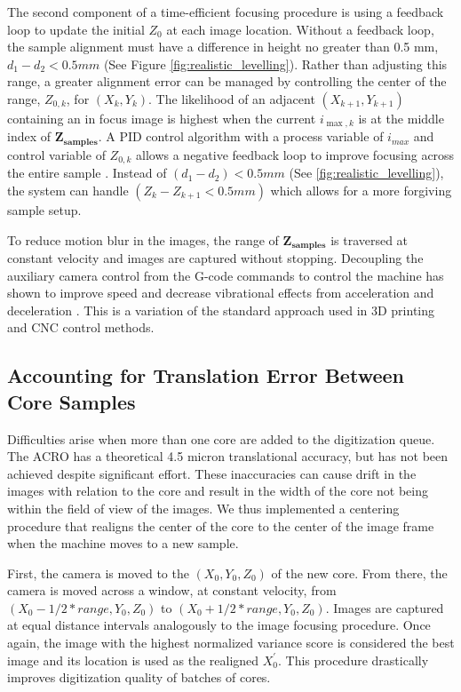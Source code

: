 \documentclass[a4paper,12pt]{article}
\begin{document}
The second component of a time-efficient focusing procedure is using a feedback loop to update the initial $Z_0$ at each image location. 
Without a feedback loop, the sample alignment must have a difference in height no greater than 0.5 mm, $d_1 - d_2 < 0.5 mm $ (See Figure \ref{fig:realistic_levelling}). 
Rather than adjusting this range, a greater alignment error can be managed by controlling the center of the range, $Z_{0,k}$, for $(X_k,Y_k)$. 
The likelihood of an adjacent $(X_{k+1}, Y_{k+1})$ containing an in focus image is highest when the current $i_{{\max,k}}$ is at the middle index of $\boldsymbol{Z_{samples}}$. 
A PID control algorithm with a process variable of $i_{max}$ and control variable of $Z_{0,k}$ allows a negative feedback loop to improve focusing across the entire sample \citep{odwyer_summary_2000}. 
Instead of $(d_1 - d_2) < 0.5mm$ (See \ref{fig:realistic_levelling}), the system can handle $(Z_{k} - Z_{k+1} < 0.5mm)$ which allows for a more forgiving sample setup. %

To reduce motion blur in the images, the range of $\boldsymbol{Z_{\text{samples}}}$ is traversed at constant velocity and images are captured without stopping. 
Decoupling the auxiliary camera control from the G-code commands to control the machine has shown to improve speed and decrease vibrational effects from acceleration and deceleration \citep{propst_time_2025}.
This is a variation of the standard approach used in 3D printing and CNC control methods. %
  
\subsection{Accounting for Translation Error Between Core Samples}

Difficulties arise when more than one core are added to the digitization queue.
The ACRO has a theoretical 4.5 micron translational accuracy, but has not been achieved despite significant effort.
These inaccuracies can cause drift in the images with relation to the core and result in the width of the core not being within the field of view of the images.
We thus implemented a centering procedure that realigns the center of the core to the center of the image frame when the machine moves 
to a new sample. 

First, the camera is moved to the $(X_0, Y_0, Z_0)$ of the new core. 
From there, the camera is moved across a window, at constant velocity, from $(X_0 - 1/2*{range}, Y_0, Z_0)$ to $(X_0 + 1/2*{range}, Y_0, Z_0)$. 
Images are captured at equal distance intervals analogously to the image focusing procedure. 
Once again, the image with the highest normalized variance score is considered the best image and its location is used as the realigned $X_0^\prime$.
This procedure drastically improves digitization quality of batches of cores.
\end{document}
